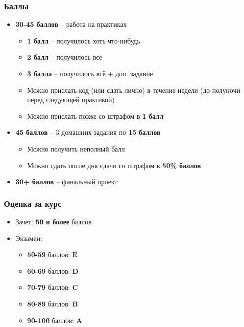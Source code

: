 \documentclass[10pt]{beamer}
\begin{document}
\begin{frame}
\frametitle{Баллы}
\begin{itemize}
\pause
\item \textbf{30-45 баллов} -- работа на практиках
\pause
\begin{itemize}
\item \textbf{1 балл} -- получилось хоть что-нибудь
\item \textbf{2 балл} -- получилось всё
\item \textbf{3 балла} -- получилось всё + доп. задание
\pause
\item Можно прислать код (или сдать лично) в течение недели (до полуночи перед следующей практикой)
\pause
\item Можно прислать позже со штрафом в \alert{\textbf{1 балл}}
\end{itemize}
\pause
\item \textbf{45 баллов} -- 3 домашних задания по \textbf{15 баллов}
\pause
\begin{itemize}
\item Можно получить неполный балл
\pause
\item Можно сдать после дня сдачи со штрафом в \alert{\textbf{50\% баллов}}
\end{itemize}
\pause
\item \textbf{30+ баллов} -- финальный проект
\end{itemize}
\end{frame}

\begin{frame}
\frametitle{Оценка за курс}
\pause
\begin{itemize}
\item Зачет: \textbf{50 и более} баллов
\pause
\item Экзамен:
\begin{itemize}
\item \textbf{50-59} баллов: \textbf{E}
\item \textbf{60-69} баллов: \textbf{D}
\item \textbf{70-79} баллов: \textbf{C}
\item \textbf{80-89} баллов: \textbf{B}
\item \textbf{90-100} баллов: \textbf{A}
\end{itemize}
\end{itemize}
\end{frame}
\end{document}
